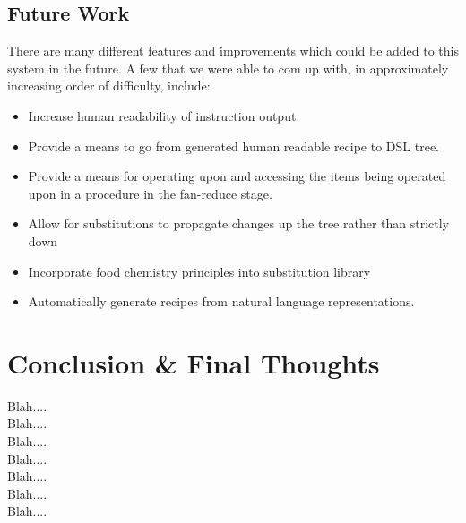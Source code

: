 \subsection{Future Work}
There are many different features and improvements which could be added to this system in the future. A few that we were able to com up with, in approximately increasing order of difficulty, include:
\begin{itemize}
\item Increase human readability of instruction output.
\item Provide a means to go from generated human readable recipe to DSL tree.
\item Provide a means for operating upon and accessing the items being operated upon in a procedure in the fan-reduce stage.
\item Allow for substitutions to propagate changes up the tree rather than strictly down
\item Incorporate food chemistry principles into substitution library
\item Automatically generate recipes from natural language representations.
\end{itemize}


















\newpage
\section{Conclusion \& Final Thoughts}
Blah....\\
Blah....\\
Blah....\\
Blah....\\
Blah....\\
Blah....\\
Blah....\\


